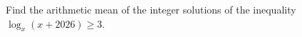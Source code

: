 Find the arithmetic mean of the integer solutions of the inequality $\log_{x}{(x+2026)}\geqslant3$.

